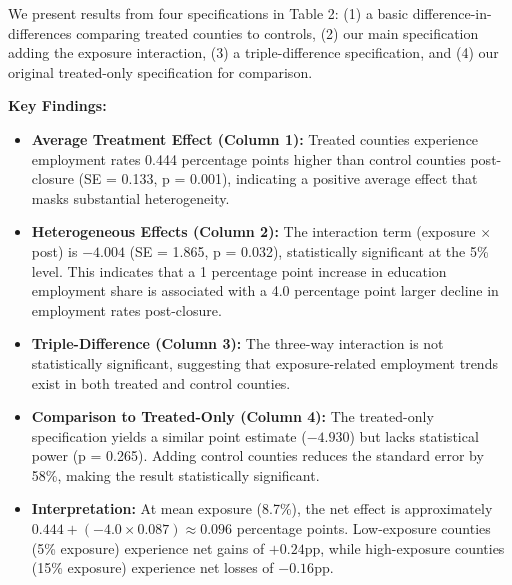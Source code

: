 \documentclass[12pt]{article}
\begin{document}
We present results from four specifications in Table 2: (1) a basic difference-in-differences comparing treated counties to controls, (2) our main specification adding the exposure interaction, (3) a triple-difference specification, and (4) our original treated-only specification for comparison.

\textbf{Key Findings:}

\begin{itemize}
\item \textbf{Average Treatment Effect (Column 1):} Treated counties experience employment rates 0.444 percentage points higher than control counties post-closure (SE = 0.133, p = 0.001), indicating a positive average effect that masks substantial heterogeneity.

\item \textbf{Heterogeneous Effects (Column 2):} The interaction term (exposure $\times$ post) is $-4.004$ (SE = 1.865, p = 0.032), statistically significant at the 5\% level. This indicates that a 1 percentage point increase in education employment share is associated with a 4.0 percentage point larger decline in employment rates post-closure.

\item \textbf{Triple-Difference (Column 3):} The three-way interaction is not statistically significant, suggesting that exposure-related employment trends exist in both treated and control counties.

\item \textbf{Comparison to Treated-Only (Column 4):} The treated-only specification yields a similar point estimate ($-4.930$) but lacks statistical power (p = 0.265). Adding control counties reduces the standard error by 58\%, making the result statistically significant.

\item \textbf{Interpretation:} At mean exposure (8.7\%), the net effect is approximately $0.444 + (-4.0 \times 0.087) \approx 0.096$ percentage points. Low-exposure counties (5\% exposure) experience net gains of $+0.24$pp, while high-exposure counties (15\% exposure) experience net losses of $-0.16$pp.
\end{itemize}
\end{document}
